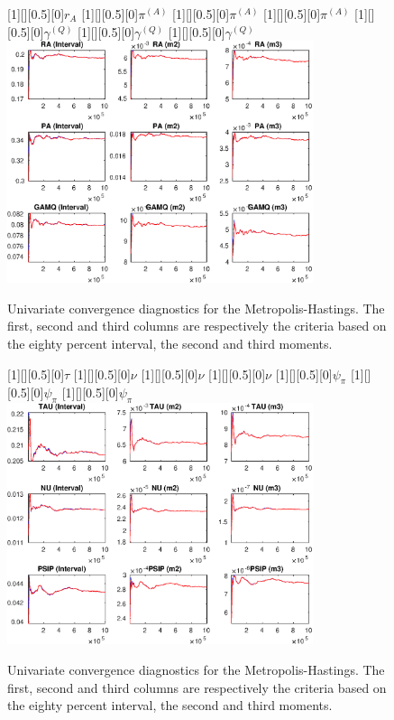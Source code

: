  
\begin{figure}[H]
[1][][0.5][0]{$ {r_{A}} $}
[1][][0.5][0]{$ {\pi^{(A)}} $}
[1][][0.5][0]{$ {\pi^{(A)}} $}
[1][][0.5][0]{$ {\pi^{(A)}} $}
[1][][0.5][0]{$ {\gamma^{(Q)}} $}
[1][][0.5][0]{$ {\gamma^{(Q)}} $}
[1][][0.5][0]{$ {\gamma^{(Q)}} $}
\centering 
\includegraphics[width=0.80\textwidth]{AnSchoModTheBuilder/Output/AnSchoModTheBuilder_udiag1}
\caption{Univariate convergence diagnostics for the Metropolis-Hastings.
The first, second and third columns are respectively the criteria based on
the eighty percent interval, the second and third moments.}\label{Fig:UnivariateDiagnostics:1}
\end{figure}

\begin{figure}[H]
[1][][0.5][0]{$ {\tau} $}
[1][][0.5][0]{$ {\nu} $}
[1][][0.5][0]{$ {\nu} $}
[1][][0.5][0]{$ {\nu} $}
[1][][0.5][0]{$ {\psi_\pi} $}
[1][][0.5][0]{$ {\psi_\pi} $}
[1][][0.5][0]{$ {\psi_\pi} $}
\centering 
\includegraphics[width=0.80\textwidth]{AnSchoModTheBuilder/Output/AnSchoModTheBuilder_udiag2}
\caption{Univariate convergence diagnostics for the Metropolis-Hastings.
The first, second and third columns are respectively the criteria based on
the eighty percent interval, the second and third moments.}\label{Fig:UnivariateDiagnostics:2}
\end{figure}

